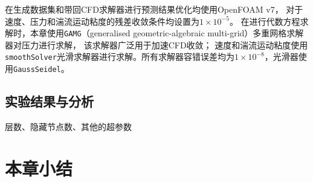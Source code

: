 在生成数据集和带回CFD求解器进行预测结果优化均使用OpenFOAM v7，
对于速度、压力和湍流运动粘度的残差收敛条件均设置为$1\times10^{-5}$。
在进行代数方程求解时，本章使用\texttt{GAMG}（generalised geometric-algebraic multi-grid）多重网格求解器对压力进行求解，
该求解器广泛用于加速CFD收敛；
速度和湍流运动粘度使用\texttt{smoothSolver}光滑求解器进行求解。所有求解器容错误差均为$1\times10^{-8}$，光滑器使用\texttt{GaussSeidel}。


\subsection{实验结果与分析}

层数、隐藏节点数、其他的超参数

\section{本章小结}

